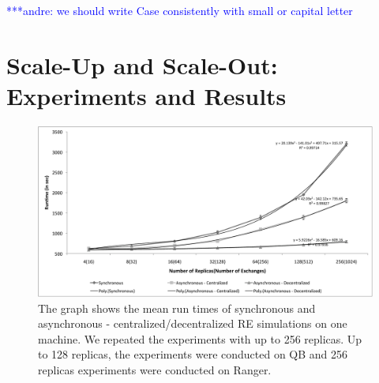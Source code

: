 \documentclass[a4paper,10pt]{article}
\newcommand{\jhanote}[1]{ {\textcolor{red} { ***shantenu: #1 }}}
\newcommand{\alnote}[1]{ {\textcolor{blue} { ***andre: #1 }}}
\newcommand{\alnote}[1]{}
\newcommand{\jhanote}[1]{}
\begin{document}
\alnote{we should write Case consistently with small or capital letter}

\section{Scale-Up and Scale-Out: Experiments and Results}

%
\begin{figure}
\centering
\includegraphics[scale=0.50]{data/scale_up.pdf}
\caption{\small The graph shows the mean run times of synchronous and asynchronous - centralized/decentralized RE simulations on one machine. We repeated the experiments with up to 256 replicas. Up to 128 replicas, the experiments were conducted on QB and 256 replicas experiments were conducted on Ranger.}
\label{fig:graph}
\vspace{-1em}
\end{figure}


\end{document}
